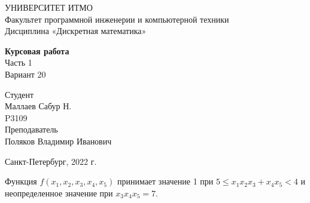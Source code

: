 \documentclass{article}
\begin{document}
\begin{center}
    УНИВЕРСИТЕТ ИТМО \\
    Факультет программной инженерии и компьютерной техники \\
    Дисциплина «Дискретная математика»
    
    \vspace{5cm}

    \large
    \textbf{Курсовая работа} \\
    Часть 1 \\
    Вариант 20
\end{center}

\vspace{2cm}

\hfill\begin{minipage}{0.35\linewidth}
Студент \\
Маллаев Сабур Н. \\
P3109 \\

Преподаватель \\
Поляков Владимир Иванович
\end{minipage}

\vfill

\begin{center}
    Санкт-Петербург, 2022 г.
\end{center}

\thispagestyle{empty}
\newpage

Функция $f(x_1, x_2, x_3, x_4, x_5)$ принимает значение 1 при $5 \le x_1 x_2 x_3 + x_4 x_5 < 4$ и неопределенное значение при $x_3 x_4 x_5 = 7$.
\end{document}
